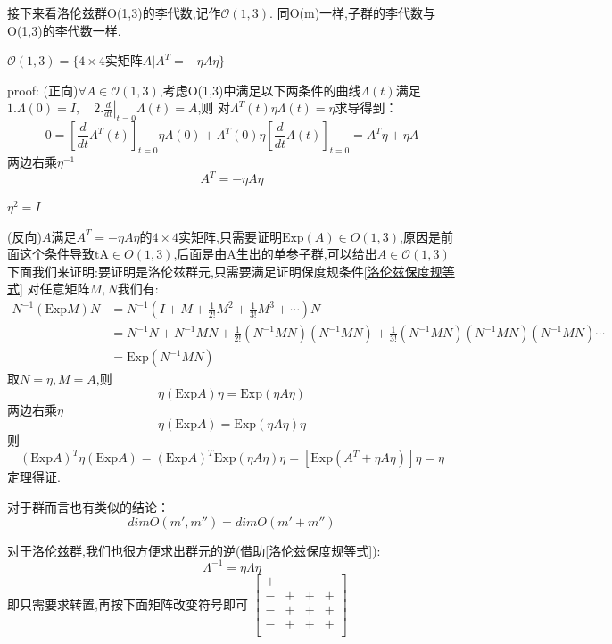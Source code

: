 \documentclass[../main.tex]{subfiles}
\begin{document}
 接下来看洛伦兹群O(1,3)的李代数,记作$\mathscr{O}(1,3)$.
 同O(m)一样,子群的李代数与O(1,3)的李代数一样.
 \begin{theorem}
     $\mathscr{O}(1,3) = \{4\times 4 \text{实矩阵}A | A^T = -\eta A \eta\}$
 \end{theorem}
 proof: (正向)$\forall A \in \mathscr{O}(1,3)$,考虑O(1,3)中满足以下两条件的曲线$\Lambda(t)$满足$1. \Lambda(0) = I,\quad 2. \left. \frac{d}{dt}\right|_{t=0}\Lambda(t) = A$,则
 对$ \Lambda^T(t)\eta \Lambda(t) = \eta $求导得到：
 $$ 0 =\left[\frac{d}{dt}\Lambda^T(t)\right]_{t = 0} \eta \Lambda(0)+ \Lambda^T(0) \eta\left[\frac{d}{dt}\Lambda(t)\right]_{t = 0} = A^T\eta + \eta A$$
 两边右乘$\eta^{-1}$
 $$A^T = -\eta A \eta$$
 \begin{note}
  $\eta^2 = I$
 \end{note}
 (反向)$A$满足$A^T = - \eta A \eta $的$4\times 4$实矩阵,只需要证明$\text{Exp}(A) \in O(1,3) $,原因是前面这个条件导致$\text{tA} \in O(1,3)$,后面是由A生出的单参子群,可以给出$A \in \mathscr{O}(1,3)$
 下面我们来证明:要证明是洛伦兹群元,只需要满足证明保度规条件\ref{洛伦兹保度规等式}
 对任意矩阵$M,N$我们有:
 \begin{align*}
     N^{-1}(\text{Exp}M)N &= N^{-1}(I + M + \frac{1}{2!}M^2 + \frac{1}{3!}M^3 + \cdots )N\\
             &=N^{-1}N +N^{-1}MN + \frac{1}{2!} (N^{-1}MN) (N^{-1}MN) + \frac{1}{3!} (N^{-1}MN) (N^{-1}MN) (N^{-1}MN) \cdots\\
             &=\text{Exp}(N^{-1}MN)
 \end{align*}
 取$N=\eta ,M = A$,则
 $$\eta(\text{Exp}A)\eta = \text{Exp}(\eta A \eta)$$
 两边右乘$\eta$
 $$\eta(\text{Exp}A) = \text{Exp}(\eta A \eta)\eta$$
 则
 $$(\text{Exp}A)^T \eta (\text{Exp}A) = (\text{Exp}A)^T\text{Exp}(\eta A \eta)\eta = [\text{Exp}(A^T + \eta A \eta) ]\eta = \eta$$
 定理得证.

 对于群而言也有类似的结论：
 $$dimO(m',m'') = dimO(m'+m'')$$

 对于洛伦兹群,我们也很方便求出群元的逆(借助\ref{洛伦兹保度规等式}):
 $$ \Lambda^{-1} = \eta \Lambda \eta $$
 即只需要求转置,再按下面矩阵改变符号即可
 $\begin{bmatrix}
     +&-&-&-\\
     -&+&+&+\\
     -&+&+&+\\
     -&+&+&+\\
 \end{bmatrix}$
\end{document}
